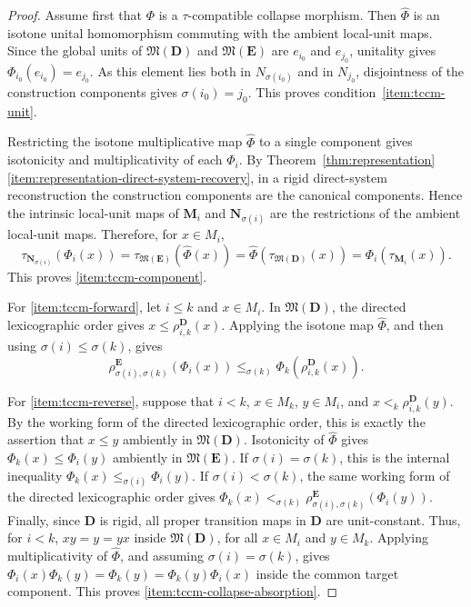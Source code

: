 \documentclass[pdflatex,sn-mathphys-num]{sn-jnl}
\theoremstyle{thmstyleone}%
\theoremstyle{thmstyletwo}%
\theoremstyle{thmstylethree}%
\begin{document}
\begin{proof}
Assume first that \(\Phi\) is a \(\tau\)-compatible collapse morphism.
Then \(\widehat\Phi\) is an isotone unital homomorphism commuting with the ambient local-unit maps.
Since the global units of \(\mathfrak M(\mathbf D)\) and \(\mathfrak M(\mathbf E)\) are \(e_{i_0}\) and \(e_{j_0}\), unitality gives \(\Phi_{i_0}(e_{i_0})=e_{j_0}\).
As this element lies both in \(N_{\sigma(i_0)}\) and in \(N_{j_0}\), disjointness of the construction components gives \(\sigma(i_0)=j_0\).
This proves condition~\ref{item:tccm-unit}.

Restricting the isotone multiplicative map \(\widehat\Phi\) to a single component gives isotonicity and multiplicativity of each \(\Phi_i\).
By Theorem~\ref{thm:representation}\ref{item:representation-direct-system-recovery}, in a rigid direct-system reconstruction the construction components are the canonical components.
Hence the intrinsic local-unit maps of \(\mathbf M_i\) and \(\mathbf N_{\sigma(i)}\) are the restrictions of the ambient local-unit maps.
Therefore, for \(x\in M_i\),
\[
\tau_{\mathbf N_{\sigma(i)}}(\Phi_i(x))
=
\tau_{\mathfrak M(\mathbf E)}(\widehat\Phi(x))
=
\widehat\Phi(\tau_{\mathfrak M(\mathbf D)}(x))
=
\Phi_i(\tau_{\mathbf M_i}(x)).
\]
This proves \ref{item:tccm-component}.

For \ref{item:tccm-forward}, let \(i\le k\) and \(x\in M_i\).
In \(\mathfrak M(\mathbf D)\), the directed lexicographic order gives \(x\le \rho^{\mathbf D}_{i,k}(x). \)
Applying the isotone map \(\widehat\Phi\), and then using \(\sigma(i)\le\sigma(k)\), gives
\[
\rho^{\mathbf E}_{\sigma(i),\sigma(k)}(\Phi_i(x))
\le_{\sigma(k)}
\Phi_k(\rho^{\mathbf D}_{i,k}(x)).
\]

For \ref{item:tccm-reverse}, suppose that \(i<k\), \(x\in M_k\), \(y\in M_i\), and \(x<_k\rho^{\mathbf D}_{i,k}(y)\).
By the working form of the directed lexicographic order, this is exactly the assertion that \(x\le y\) ambiently in \(\mathfrak M(\mathbf D)\).
Isotonicity of \(\widehat\Phi\) gives \(\Phi_k(x)\le \Phi_i(y)\) ambiently in \(\mathfrak M(\mathbf E)\).
If \(\sigma(i)=\sigma(k)\), this is the internal inequality \(\Phi_k(x)\le_{\sigma(i)}\Phi_i(y)\).
If \(\sigma(i)<\sigma(k)\), the same working form of the directed lexicographic order gives \(\Phi_k(x)<_{\sigma(k)} \rho^{\mathbf E}_{\sigma(i),\sigma(k)}(\Phi_i(y)). \)
Finally, since \(\mathbf D\) is rigid, all proper transition maps in \(\mathbf D\) are unit-constant.
Thus, for \(i<k\), \(xy=y=yx\) inside \(\mathfrak M(\mathbf D)\), for all \(x\in M_i\) and \(y\in M_k\).
Applying multiplicativity of \(\widehat\Phi\), and assuming \(\sigma(i)=\sigma(k)\), gives \(\Phi_i(x)\Phi_k(y)=\Phi_k(y)=\Phi_k(y)\Phi_i(x) \) inside the common target component.
This proves \ref{item:tccm-collapse-absorption}.


\end{proof}
\end{document}
